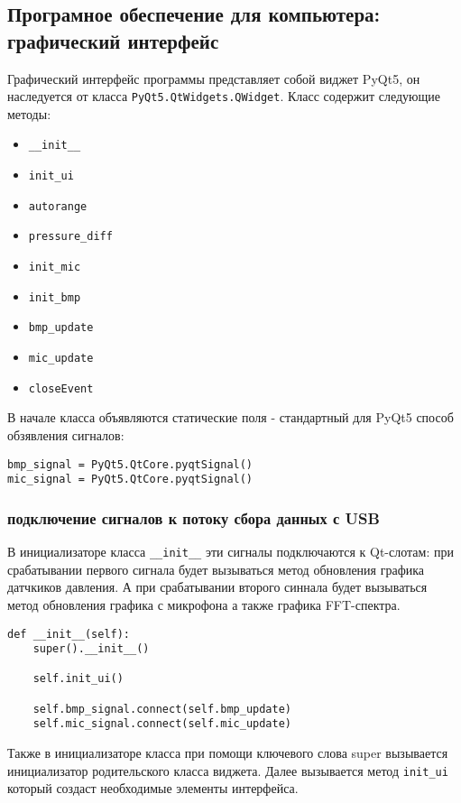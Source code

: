 \documentclass[../main.tex]{subfiles}
\begin{document}
\subsection{Програмное обеспечение для компьютера: графический интерфейс}
Графический интерфейс программы представляет собой виджет PyQt5, он наследуется от класса \texttt{PyQt5.QtWidgets.QWidget}. Класс содержит следующие методы:

\begin{itemize}
    \item \texttt{\_\_init\_\_}
    \item \texttt{init\_ui}
    \item \texttt{autorange}
    \item \texttt{pressure\_diff}
    \item \texttt{init\_mic}
    \item \texttt{init\_bmp}
    \item \texttt{bmp\_update}
    \item \texttt{mic\_update}
    \item \texttt{closeEvent}
\end{itemize}

В начале класса объявляются статические поля - стандартный для PyQt5 способ обзявления сигналов:
\begin{lstlisting}
bmp_signal = PyQt5.QtCore.pyqtSignal()
mic_signal = PyQt5.QtCore.pyqtSignal()
\end{lstlisting}

\subsubsection{подключение сигналов к потоку сбора данных с USB}

В инициализаторе класса \texttt{\_\_init\_\_} эти сигналы подключаются к Qt-слотам: при срабатывании первого сигнала будет вызываться метод обновления графика датчкиков давления. А при срабатывании второго синнала будет вызываться метод обновления графика с микрофона а также графика FFT-спектра.

\begin{lstlisting}
def __init__(self):
    super().__init__()

    self.init_ui()

    self.bmp_signal.connect(self.bmp_update)
    self.mic_signal.connect(self.mic_update)
\end{lstlisting}

Также в инициализаторе класса при помощи ключевого слова super вызывается инициализатор родительского класса виджета. Далее вызывается метод \verb|init_ui| который создаст необходимые элементы интерфейса.
\end{document}
